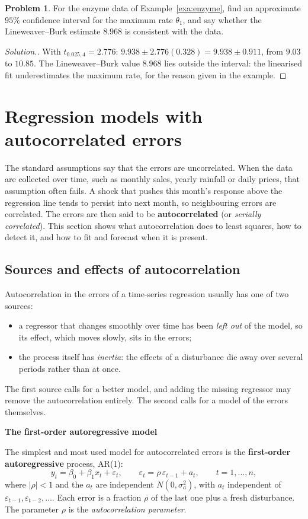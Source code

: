 \documentclass[11pt,a4paper]{article}
\numberwithin{equation}{section}
\theoremstyle{definition}
\newtheorem{problemx}{Problem}[subsection]
\newenvironment{problem}{\begin{problemx}}{\end{problemx}}
\newenvironment{solution}
  {\renewcommand{\qedsymbol}{}\begin{proof}[\textit{Solution}.]}
  {\end{proof}}
\newcommand{\subhead}[1]{%
  \par\medskip\noindent\textbf{#1}\par\nobreak\smallskip}
\begin{document}
\begin{problem}\label{prob:mm-inference}
For the enzyme data of Example~\ref{exa:enzyme}, find an approximate $95\%$ confidence interval for the maximum rate $\theta_1$,
and say whether the Lineweaver--Burk estimate $8.968$ is consistent with the data.
\end{problem}

\begin{solution}
With $t_{0.025,4} = 2.776$: $9.938 \pm 2.776(0.328) = 9.938 \pm 0.911$, from $9.03$ to $10.85$. The Lineweaver--Burk value $8.968$ lies outside
the interval: the linearised fit underestimates the maximum rate, for the reason given in the example.
\end{solution}

\section{Regression models with autocorrelated errors}
The standard assumptions say that the errors are uncorrelated. When the data are collected over time,
such as monthly sales, yearly rainfall or daily prices, that assumption often fails. A shock that pushes this
month's response above the regression line tends to persist into next month, so neighbouring errors are
correlated. The errors are then said to be \textbf{autocorrelated} (or \emph{serially correlated}). This section shows
what autocorrelation does to least squares, how to detect it, and how to fit and forecast when it is present.

\subsection{Sources and effects of autocorrelation}
Autocorrelation in the errors of a time-series regression usually has one of two sources:
\begin{itemize}
\item a regressor that changes smoothly over time has been \emph{left out} of the model, so its effect, which
moves slowly, sits in the errors;
\item the process itself has \emph{inertia}: the effects of a disturbance die away over several periods rather than at
once.
\end{itemize}
The first source calls for a better model, and adding the missing regressor may remove the
autocorrelation entirely. The second calls for a model of the errors themselves.

\subhead{The first-order autoregressive model}
The simplest and most used model for autocorrelated errors is the \textbf{first-order autoregressive}
process, AR(1):
\[
y_t = \beta_0 + \beta_1x_t + \varepsilon_t , \qquad \varepsilon_t = \rho\,\varepsilon_{t-1} + a_t , \qquad t = 1, \dots, n ,
\]
where $|\rho| < 1$ and the $a_t$ are independent $N(0, \sigma_a^2)$, with $a_t$ independent of $\varepsilon_{t-1}, \varepsilon_{t-2}, \dots$. Each error is a
fraction $\rho$ of the last one plus a fresh disturbance. The parameter $\rho$ is the \emph{autocorrelation parameter}.
\end{document}
